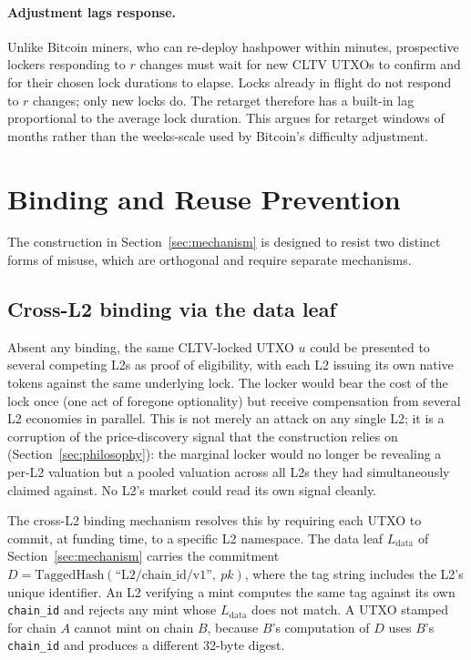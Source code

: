 \documentclass[11pt,a4paper]{article}
\begin{document}
\paragraph{Adjustment lags response.} Unlike Bitcoin miners, who can re-deploy hashpower within minutes, prospective lockers responding to $r$ changes must wait for new CLTV UTXOs to confirm and for their chosen lock durations to elapse. Locks already in flight do not respond to $r$ changes; only new locks do. The retarget therefore has a built-in lag proportional to the average lock duration. This argues for retarget windows of months rather than the weeks-scale used by Bitcoin's difficulty adjustment.

\section{Binding and Reuse Prevention}
\label{sec:binding}

The construction in Section~\ref{sec:mechanism} is designed to resist two distinct forms of misuse, which are orthogonal and require separate mechanisms.

\subsection{Cross-L2 binding via the data leaf}

Absent any binding, the same CLTV-locked UTXO $u$ could be presented to several competing L2s as proof of eligibility, with each L2 issuing its own native tokens against the same underlying lock. The locker would bear the cost of the lock once (one act of foregone optionality) but receive compensation from several L2 economies in parallel. This is not merely an attack on any single L2; it is a corruption of the price-discovery signal that the construction relies on (Section~\ref{sec:philosophy}): the marginal locker would no longer be revealing a per-L2 valuation but a pooled valuation across all L2s they had simultaneously claimed against. No L2's market could read its own signal cleanly.

The cross-L2 binding mechanism resolves this by requiring each UTXO to commit, at funding time, to a specific L2 namespace. The data leaf $L_{\mathrm{data}}$ of Section~\ref{sec:mechanism} carries the commitment $D = \mathrm{TaggedHash}(\text{``L2/chain\_id/v1''},\ pk)$, where the tag string includes the L2's unique identifier. An L2 verifying a mint computes the same tag against its own \texttt{chain\_id} and rejects any mint whose $L_{\mathrm{data}}$ does not match. A UTXO stamped for chain $A$ cannot mint on chain $B$, because $B$'s computation of $D$ uses $B$'s \texttt{chain\_id} and produces a different 32-byte digest.
\end{document}
